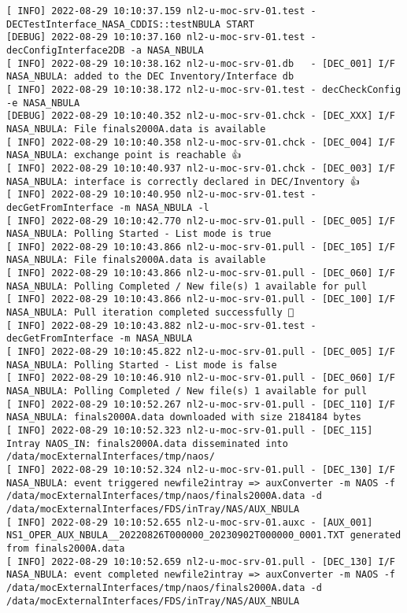\documentclass[dec_sum_main.tex]{subfiles}
\begin{document}
\begin{Verbatim}[fontsize=\tiny]
[ INFO] 2022-08-29 10:10:37.159 nl2-u-moc-srv-01.test - DECTestInterface_NASA_CDDIS::testNBULA START
[DEBUG] 2022-08-29 10:10:37.160 nl2-u-moc-srv-01.test - decConfigInterface2DB -a NASA_NBULA
[ INFO] 2022-08-29 10:10:38.162 nl2-u-moc-srv-01.db   - [DEC_001] I/F NASA_NBULA: added to the DEC Inventory/Interface db
[ INFO] 2022-08-29 10:10:38.172 nl2-u-moc-srv-01.test - decCheckConfig -e NASA_NBULA
[DEBUG] 2022-08-29 10:10:40.352 nl2-u-moc-srv-01.chck - [DEC_XXX] I/F NASA_NBULA: File finals2000A.data is available
[ INFO] 2022-08-29 10:10:40.358 nl2-u-moc-srv-01.chck - [DEC_004] I/F NASA_NBULA: exchange point is reachable 👍
[ INFO] 2022-08-29 10:10:40.937 nl2-u-moc-srv-01.chck - [DEC_003] I/F NASA_NBULA: interface is correctly declared in DEC/Inventory 👍
[ INFO] 2022-08-29 10:10:40.950 nl2-u-moc-srv-01.test - decGetFromInterface -m NASA_NBULA -l
[ INFO] 2022-08-29 10:10:42.770 nl2-u-moc-srv-01.pull - [DEC_005] I/F NASA_NBULA: Polling Started - List mode is true
[ INFO] 2022-08-29 10:10:43.866 nl2-u-moc-srv-01.pull - [DEC_105] I/F NASA_NBULA: File finals2000A.data is available
[ INFO] 2022-08-29 10:10:43.866 nl2-u-moc-srv-01.pull - [DEC_060] I/F NASA_NBULA: Polling Completed / New file(s) 1 available for pull
[ INFO] 2022-08-29 10:10:43.866 nl2-u-moc-srv-01.pull - [DEC_100] I/F NASA_NBULA: Pull iteration completed successfully 🕺
[ INFO] 2022-08-29 10:10:43.882 nl2-u-moc-srv-01.test - decGetFromInterface -m NASA_NBULA
[ INFO] 2022-08-29 10:10:45.822 nl2-u-moc-srv-01.pull - [DEC_005] I/F NASA_NBULA: Polling Started - List mode is false
[ INFO] 2022-08-29 10:10:46.910 nl2-u-moc-srv-01.pull - [DEC_060] I/F NASA_NBULA: Polling Completed / New file(s) 1 available for pull
[ INFO] 2022-08-29 10:10:52.267 nl2-u-moc-srv-01.pull - [DEC_110] I/F NASA_NBULA: finals2000A.data downloaded with size 2184184 bytes
[ INFO] 2022-08-29 10:10:52.323 nl2-u-moc-srv-01.pull - [DEC_115] Intray NAOS_IN: finals2000A.data disseminated into /data/mocExternalInterfaces/tmp/naos/
[ INFO] 2022-08-29 10:10:52.324 nl2-u-moc-srv-01.pull - [DEC_130] I/F NASA_NBULA: event triggered newfile2intray => auxConverter -m NAOS -f /data/mocExternalInterfaces/tmp/naos/finals2000A.data -d /data/mocExternalInterfaces/FDS/inTray/NAS/AUX_NBULA
[ INFO] 2022-08-29 10:10:52.655 nl2-u-moc-srv-01.auxc - [AUX_001] NS1_OPER_AUX_NBULA__20220826T000000_20230902T000000_0001.TXT generated from finals2000A.data
[ INFO] 2022-08-29 10:10:52.659 nl2-u-moc-srv-01.pull - [DEC_130] I/F NASA_NBULA: event completed newfile2intray => auxConverter -m NAOS -f /data/mocExternalInterfaces/tmp/naos/finals2000A.data -d /data/mocExternalInterfaces/FDS/inTray/NAS/AUX_NBULA

\end{Verbatim}
\end{document}
